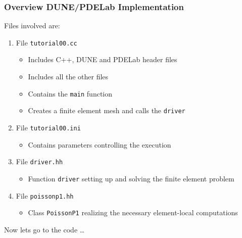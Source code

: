 \documentclass[aspectratio=169,11pt]{beamer}
\theoremstyle{definition}
\begin{document}
\begin{frame}
\frametitle{Overview DUNE/PDELab Implementation}
Files involved are:
\begin{enumerate}[1)]
\item File \lstinline{tutorial00.cc}
\begin{itemize}
\item Includes C++, DUNE and PDELab header files
\item Includes all the other files
\item Contains the \lstinline{main} function
\item Creates a finite element mesh and calls the \lstinline{driver}
\end{itemize}
\item File \lstinline{tutorial00.ini}
\begin{itemize}
\item Contains parameters controlling the execution
\end{itemize}
\item File \lstinline{driver.hh}
\begin{itemize}
\item Function \lstinline{driver} setting up and solving the finite element problem
\end{itemize}
\item File \lstinline{poissonp1.hh}
\begin{itemize}
\item Class \lstinline{PoissonP1}
realizing the necessary element-local computations
\end{itemize}
\end{enumerate}
Now lets go to the code \ldots
\end{frame}
\end{document}
